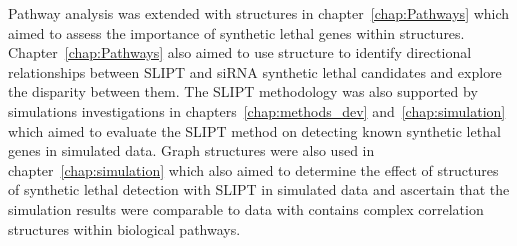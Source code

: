 Pathway analysis was extended with  structures in chapter~\ref{chap:Pathways} which aimed to assess the importance of \gls{synthetic lethal} genes within  structures. Chapter~\ref{chap:Pathways} also aimed to use  structure to identify directional relationships between \gls{SLIPT} and \gls{siRNA} \gls{synthetic lethal} candidates and explore the disparity between them. The \gls{SLIPT} methodology was also supported by simulations investigations in chapters~\ref{chap:methods_dev} and~\ref{chap:simulation} which aimed to evaluate the \gls{SLIPT} method on detecting known \gls{synthetic lethal} genes in simulated data. Graph structures were also used in chapter~\ref{chap:simulation} which also aimed to determine the effect of  structures of \gls{synthetic lethal} detection with \gls{SLIPT} in simulated data and ascertain that the simulation results were comparable to  data with contains complex correlation structures within biological pathways.

